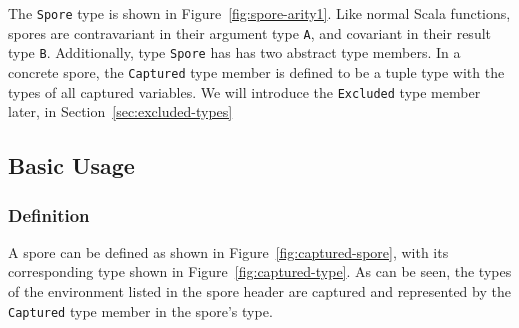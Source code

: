 \documentclass{llncs}
\begin{document}




The \verb|Spore| type is shown in Figure~\ref{fig:spore-arity1}. Like normal
Scala functions, spores are contravariant in their argument type \verb|A|, and
covariant in their result type \verb|B|. Additionally, type \verb|Spore| has
has two abstract type members. In a concrete spore, the \verb|Captured| type
member is defined to be a tuple type with the types of all captured variables.
We will introduce the \verb|Excluded| type member later, in Section~\ref{sec:excluded-types}

\vspace{2mm}
\subsection{Basic Usage}
\label{sec:basic-usage}
\vspace{1mm}


\subsubsection{Definition}

A spore can be defined as shown in Figure~\ref{fig:captured-spore}, with its
corresponding type shown in Figure~\ref{fig:captured-type}. As can be seen,
the types of the environment listed in the spore header are captured and
represented by the \verb|Captured| type member in the spore's type.
\end{document}
